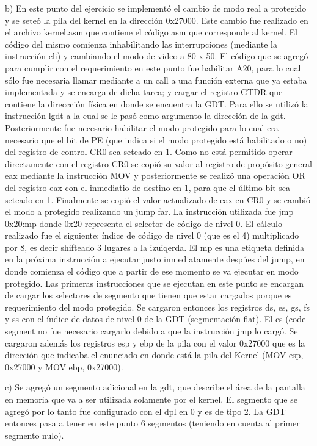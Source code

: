 \documentclass[a4paper]{article}
\begin{document}
b) En este punto del ejercicio se implementó el cambio de modo real a protegido y se seteó la pila del kernel en la dirección 0x27000. Este cambio fue realizado en el archivo kernel.asm que contiene el código asm que corresponde al kernel. El código del mismo comienza inhabilitando las interrupciones (mediante la instrucción cli) y cambiando el modo de video a 80 x 50. El código que se agregó para cumplir con el requerimiento en este punto fue habilitar A20, para lo cual sólo fue necesaria llamar mediante a un call a una función externa que ya estaba implementada y se encarga de dicha tarea; y cargar el registro GTDR que contiene la direccción física en donde se encuentra la GDT. Para ello se utilizó la instrucción lgdt a la cual se le pasó como argumento la dirección de la gdt. Posteriormente fue necesario habilitar el modo protegido para lo cual era necesario que el bit de PE (que indica si el modo protegido está habilitado o no) del registro de control CR0 sea seteado en 1. Como no está permitido operar directamente con el registro CR0 se copió su valor al registro de propósito general eax mediante la instrucción MOV y posteriormente se realizó una operación OR del registro eax con el inmediatio de destino en 1, para que el último bit sea seteado en 1. Finalmente se copió el valor actualizado de eax en CR0 y se cambió el modo a protegido realizando un jump far. La instrucción utilizada fue jmp 0x20:mp donde 0x20 representa el selector de código de nivel 0. El cálculo realizado fue el siguiente: índice de código de nivel 0 (que es el 4) multiplicado por 8, es decir shifteado 3 lugares a la izuiqerda. El mp es una etiqueta definida en la próxima instrucción a ejecutar justo inmediatamente despúes del jump, en donde comienza el código que a partir de ese momento se va ejecutar en modo protegido. Las primeras instrucciones que se ejecutan en este punto se encargan de cargar los selectores de segmento que tienen que estar cargados porque es requerimiento del modo protegido. Se cargaron entonces los registros ds, es, gs, fs y ss con el índice de datos de nivel 0 de la GDT (segmentación flat). El cs (code segment no fue necesario cargarlo debido a que la instrucción jmp lo cargó. Se cargaron además los registros esp y ebp de la pila con el valor 0x27000 que es la dirección que indicaba el enunciado en donde está la pila del Kernel (MOV esp, 0x27000 y MOV ebp, 0x27000).

c) Se agregó un segmento adicional en la gdt, que describe el área de la pantalla en memoria que va a ser utilizada solamente por el kernel. El segmento que se agregó por lo tanto fue configurado con el dpl en 0 y es de tipo 2. La GDT entonces pasa a tener en este punto 6 segmentos (teniendo en cuenta al primer segmento nulo).
\end{document}
